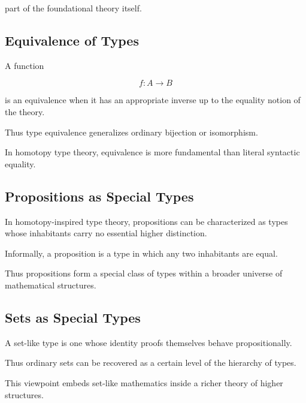part of the foundational theory itself.

\subsection{Equivalence of Types}
\label{subsec:type-equivalence}

A function

\[
f:A\to B
\]

is an equivalence when it has an appropriate inverse up to the equality
notion of the theory.

Thus type equivalence generalizes ordinary bijection or isomorphism.

In homotopy type theory, equivalence is more fundamental than literal
syntactic equality.

\subsection{Propositions as Special Types}
\label{subsec:propositions-special-types}

In homotopy-inspired type theory, propositions can be characterized as
types whose inhabitants carry no essential higher distinction.

Informally, a proposition is a type in which any two inhabitants are equal.

Thus propositions form a special class of types within a broader universe
of mathematical structures.

\subsection{Sets as Special Types}
\label{subsec:sets-special-types}

A set-like type is one whose identity proofs themselves behave
propositionally.

Thus ordinary sets can be recovered as a certain level of the hierarchy of
types.

This viewpoint embeds set-like mathematics inside a richer theory of
higher structures.

